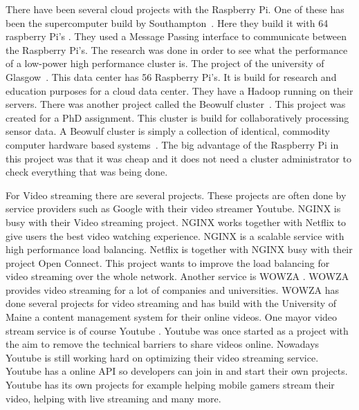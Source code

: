 \documentclass{sig-alternate-br}
\begin{document}
There have been several cloud projects with the Raspberry Pi. \newline
One of these has been the supercomputer build by Southampton~\cite{cox:2014}. Here they build it with 64 raspberry Pi's . They used a Message Passing interface to communicate between the Raspberry Pi's. The research was done in order to see what the performance of a low-power high performance cluster is. \newline
The project of the university of Glasgow~\cite{tso:2013}. This data center has 56 Raspberry Pi's. It is build for research and education purposes for a cloud data center. They have a Hadoop running on their servers. \newline
There was another project called the Beowulf cluster~\cite{beowolf-setup}. This project was created for a PhD assignment. This cluster is build for collaboratively processing sensor data.  A Beowulf cluster is simply a collection of identical, commodity computer hardware based systems~\cite{beowolf-setup}. The big advantage of the Raspberry Pi in this project was that it was cheap and it does not need a cluster administrator to check everything that was being done. 

For Video streaming there are several projects. These projects are often done by service providers such as Google with their video streamer Youtube. \newline
NGINX is busy with their Video streaming project. NGINX works together with Netflix to give users the best video watching experience. NGINX is a scalable service with high performance load balancing.  Netflix is together with NGINX busy with their project Open Connect. This project wants to improve the load balancing for video streaming over the whole network. \newline
Another service is WOWZA \cite{wowza}. WOWZA provides video streaming for a lot of companies and universities. WOWZA has done several projects for video streaming and has build with the University of Maine a content management system for their online videos. 
One mayor video stream service is of course Youtube \cite{youtube}. Youtube was once started as a project with the aim to remove the technical barriers to share videos online. Nowadays Youtube is still working hard on optimizing their video streaming service. Youtube has a online API so developers can join in and start their own projects. Youtube has its own projects for example helping mobile gamers stream their video, helping with live streaming and many more.
\end{document}
